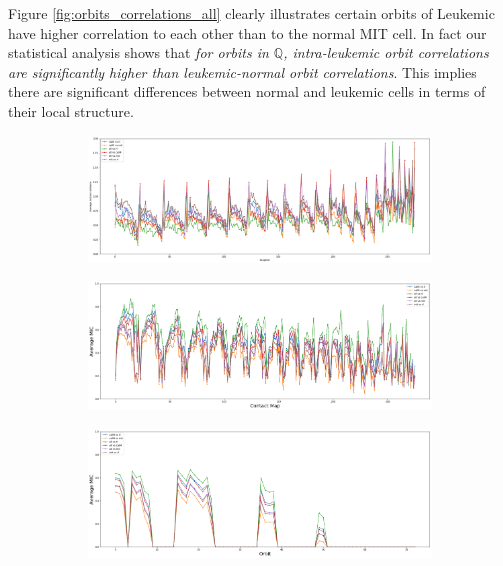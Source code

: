 \documentclass[a4,center,fleqn]{NAR}
\begin{document}
Figure \ref{fig:orbits_correlations_all} clearly illustrates certain
orbits of Leukemic have higher correlation to each other than to the
normal MIT cell. In fact our statistical analysis shows that 
\textit {for orbits in $\mathbb{Q}$, 
intra-leukemic orbit correlations are significantly higher
than leukemic-normal orbit correlations}. This implies
there are significant differences between normal and
leukemic cells in terms of their local structure.
\begin{figure}
    \centering
    \begin{subfigure}[b]{.5\textwidth}
        \includegraphics[width=\textwidth]{figures/orbit-distances_all.png}
        \caption{}
        \label{fig:orbit-distances_all}
    \end{subfigure}
    \begin{subfigure}[b]{.5\textwidth}
        \includegraphics[width=\textwidth]{figures/contact_maps_correlations_all.png}
        \caption{}
        \label{fig:contact_maps_correlations_all}
    \end{subfigure}
    \begin{subfigure}[b]{.5\textwidth}
        \includegraphics[width=\textwidth]{figures/orbits_correlations_all.png}

\end{subfigure}
\end{figure}
\end{document}
